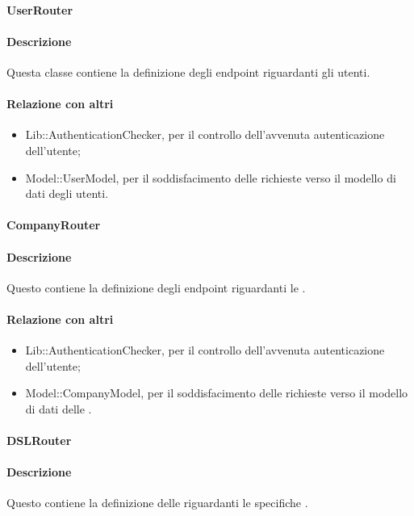\paragraph{UserRouter}
\paragraph*{Descrizione}
Questa classe contiene la definizione degli endpoint riguardanti gli utenti. 

\paragraph*{Relazione con altri }
\begin{itemize}
\item Lib::AuthenticationChecker, per il controllo dell'avvenuta autenticazione dell'utente;
\item Model::UserModel, per il soddisfacimento delle richieste verso il modello di dati degli utenti.
\end{itemize}

\paragraph{CompanyRouter}
\paragraph*{Descrizione}
Questo  contiene la definizione degli endpoint riguardanti le .

\paragraph*{Relazione con altri }
\begin{itemize}
\item Lib::AuthenticationChecker, per il controllo dell'avvenuta autenticazione dell'utente;
\item Model::CompanyModel, per il soddisfacimento delle richieste verso il modello di dati delle .
\end{itemize}

\paragraph{DSLRouter}
\paragraph*{Descrizione}
Questo  contiene la definizione delle  riguardanti le specifiche .

